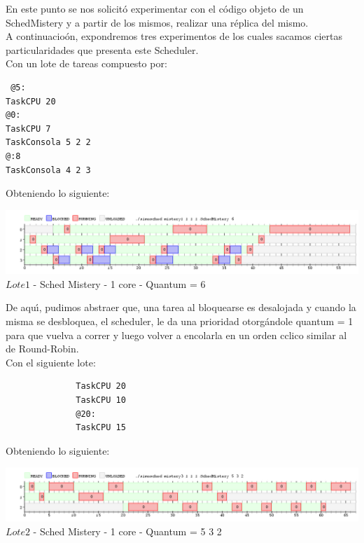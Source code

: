 \indent En este punto se nos solicit\'{o} experimentar con el c\'{o}digo objeto de un 
SchedMistery y a partir de los mismos, realizar una r\'{e}plica del mismo.\\

A continuacio\'{o}n, expondremos tres experimentos de los cuales sacamos ciertas particularidades que presenta este Scheduler.\\

Con un lote de tareas compuesto por:\\

\begin{verbatim}
 @5:
TaskCPU 20
@0:
TaskCPU 7
TaskConsola 5 2 2
@:8
TaskConsola 4 2 3
\end{verbatim}

Obteniendo lo siguiente:
\begin{center}
    	\includegraphics[width=450pt]{./Test/ej7_1.png}
	{$Lote 1$ - Sched Mistery - 1 core - Quantum = 6}	
 \end{center}
 
De aqu\'{\i}, pudimos abstraer que, una tarea al bloquearse es desalojada y cuando la misma se desbloquea, el scheduler, le da
una prioridad otorg\'{a}ndole quantum = 1 para que vuelva a correr y luego volver a encolarla en un orden cclico similar al de Round-Robin.\\

Con el siguiente lote:\\

\begin{verbatim}
              TaskCPU 20
              TaskCPU 10
              @20:
              TaskCPU 15
\end{verbatim}

Obteniendo lo siguiente:\\
\begin{center}
    	\includegraphics[width=450pt]{./Test/ej7_3.png}
	{$Lote 2$ - Sched Mistery - 1 core - Quantum = 5 3 2}	
 \end{center}
 
